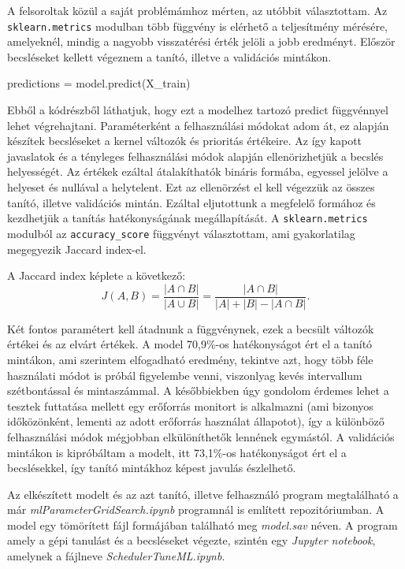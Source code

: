 A felsoroltak közül a saját problémámhoz mérten, az utóbbit választottam.
Az \texttt{sklearn.metrics} modulban több függvény is elérhető a teljesítmény mérésére, amelyeknél, mindig a nagyobb visszatérési érték jelöli a jobb eredményt.
Először becsléseket kellett végeznem a tanító, illetve a validációs mintákon.

\begin{python}
predictions = model.predict(X_train)
\end{python}

Ebből a kódrészből láthatjuk, hogy ezt a modelhez tartozó predict függvénnyel lehet végrehajtani. Paraméterként a felhasználási módokat adom át, ez alapján készítek becsléseket a kernel változók és prioritás értékeire. Az így kapott javaslatok és a tényleges felhasználási módok alapján ellenörizhetjük a becslés helyességét. Az értékek ezáltal átalakíthatók bináris formába, egyessel jelölve a helyeset és nullával a helytelent. Ezt az ellenörzést el kell végezzük az összes tanító, illetve validációs mintán.
Ezáltal eljutottunk a megfelelő formához és kezdhetjük a tanítás hatékonyságának megállapítását.
A \texttt{sklearn.metrics} modulból az \texttt{accuracy\_score} függvényt választottam, ami gyakorlatilag megegyezik Jaccard index-el.

A Jaccard index képlete a következő:
\begin{equation}
J(A,B) = \frac{|A \cap B|}{|A \cup B|} = \frac{|A \cap B|}{|A| + |B| - |A \cap B|}.
\end{equation}

Két fontos paramétert kell átadnunk a függvénynek, ezek a becsült változók értékei és az elvárt értékek.
A model 70,9\%-os hatékonyságot ért el a tanító mintákon, ami szerintem elfogadható eredmény, tekintve azt, hogy több féle használati módot is próbál figyelembe venni, viszonlyag kevés intervallum szétbontással és mintaszámmal. A későbbiekben úgy gondolom érdemes lehet a tesztek futtatása mellett egy erőforrás monitort is alkalmazni (ami bizonyos időközönként, lementi az adott erőforrás használat állapotot), így a különböző felhasználási módok mégjobban elkülöníthetők lennének egymástól.
A validációs mintákon is kipróbáltam a modelt, itt 73,1\%-os hatékonyságot ért el a becslésekkel, így tanító mintákhoz képest javulás észlelhető.

Az elkészített modelt és az azt tanító, illetve felhasználó program megtalálható a már \textit{mlParameterGridSearch.ipynb} programnál is említett repozitóriumban. A model egy tömörített fájl formájában található meg \textit{model.sav} néven. A program amely a gépi tanulást és a becsléseket végezte, szintén egy \textit{Jupyter notebook}, amelynek a fájlneve \textit{SchedulerTuneML.ipynb}.
